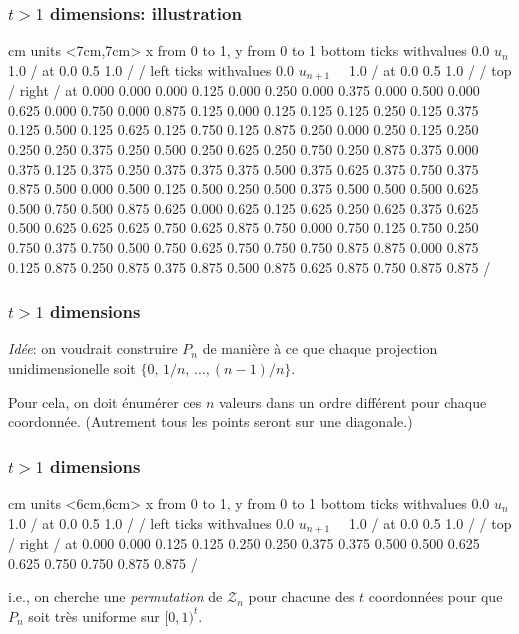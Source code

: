 \documentclass[t,usepdftitle=false]{beamer}
\def\ZZ{\mathcal{Z}}
\begin{document}
\begin{frame}
\frametitle{$t > 1$ dimensions: illustration}

\begin {center}
 cm 
\beginpicture
\setcoordinatesystem units <7cm,7cm>
\setplotarea x from 0 to 1, y from 0 to 1
\axis bottom
ticks withvalues     0.0  $u_n$  1.0 / at 0.0 0.5 1.0 / / 
\axis left
ticks withvalues     0.0  $u_{n+1}$~~  1.0 / at 0.0 0.5 1.0 / / 
\axis top /  \axis right /
%
 at
0.000  0.000   
0.000  0.125      
0.000  0.250      
0.000  0.375      
0.000  0.500      
0.000  0.625      
0.000  0.750      
0.000  0.875      
%
0.125  0.000
0.125  0.125      
0.125  0.250
0.125  0.375
0.125  0.500
0.125  0.625
0.125  0.750
0.125  0.875
%
0.250  0.000
0.250  0.125      
0.250  0.250
0.250  0.375
0.250  0.500
0.250  0.625
0.250  0.750
0.250  0.875
%
0.375  0.000
0.375  0.125      
0.375  0.250
0.375  0.375
0.375  0.500
0.375  0.625
0.375  0.750
0.375  0.875
%
0.500  0.000
0.500  0.125      
0.500  0.250
0.500  0.375
0.500  0.500
0.500  0.625
0.500  0.750
0.500  0.875
%
0.625  0.000
0.625  0.125      
0.625  0.250
0.625  0.375
0.625  0.500
0.625  0.625
0.625  0.750
0.625  0.875
%
0.750  0.000
0.750  0.125      
0.750  0.250
0.750  0.375
0.750  0.500
0.750  0.625
0.750  0.750
0.750  0.875
%
0.875  0.000
0.875  0.125      
0.875  0.250
0.875  0.375
0.875  0.500
0.875  0.625
0.875  0.750
0.875  0.875
/ \endpicture
\end {center}

\end{frame}

\begin{frame}
\frametitle{$t > 1$ dimensions}

\emph{Id\'ee}: on voudrait construire $P_n$ de mani\`ere \`a ce que 
chaque projection unidimensionelle soit $\{0,\, 1/n,\, \dots, (n-1)/n\}$.

\mbox{}

Pour cela, on doit \'enum\'erer ces $n$ valeurs dans un ordre diff\'erent
pour chaque coordonn\'ee. (Autrement tous les points seront sur une diagonale.)

\end{frame}

\begin{frame}
\frametitle{$t > 1$ dimensions}

\begin {center}
 cm 
\beginpicture
\setcoordinatesystem units <6cm,6cm>
\setplotarea x from 0 to 1, y from 0 to 1
\axis bottom
ticks withvalues     0.0  $u_n$  1.0 / at 0.0 0.5 1.0 / / 
\axis left
ticks withvalues     0.0  $u_{n+1}$~~  1.0 / at 0.0 0.5 1.0 / / 
\axis top /  \axis right /
%
 at
0.000  0.000   
0.125  0.125      
0.250  0.250
0.375  0.375
0.500  0.500
0.625  0.625
0.750  0.750
0.875  0.875
/ \endpicture
\end {center}

i.e., on cherche une \emph{permutation} de $\ZZ_n$ pour chacune des 
$t$ coordonn\'ees pour que $P_n$ soit tr\`es uniforme
sur $[0,1)^t$.

\end{frame}
\end{document}
